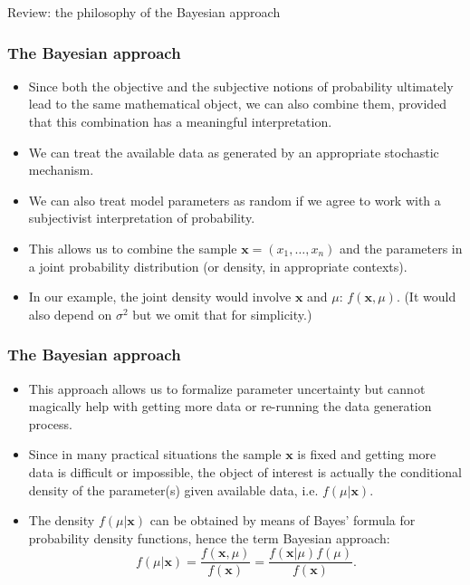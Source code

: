 \documentclass[10pt]{beamer}
\theoremstyle{definition}
\begin{document}
\begin{section}{Review: the philosophy of the Bayesian approach}
\begin{frame}
\frametitle{The Bayesian approach}
\begin{itemize}\itemsep1em
\item Since both the objective and the subjective notions of probability ultimately lead to the same mathematical object, we can also combine them, provided that this combination has a meaningful interpretation. \pause
\item We can treat the available data as generated by an appropriate stochastic mechanism.
\item We can also treat model parameters as random if we agree to work with a subjectivist interpretation of probability.
\item This allows us to combine the sample $\mathbf{x}=(x_1,\ldots,x_n)$ and the parameters in a joint probability distribution (or density, in appropriate contexts).
\item In our example, the joint density would involve $\mathbf{x}$ and
$\mu$: $f(\mathbf{x},\mu)$. (It would also depend on $ \sigma^2 $ but we omit that for simplicity.)
\end{itemize}
\end{frame}

\begin{frame}
\frametitle{The Bayesian approach}
\begin{itemize}\itemsep1em
\item This approach allows us to formalize parameter uncertainty but cannot magically help with getting more data or re-running the data generation process.
\item Since in many practical situations the sample $\mathbf{x}$ is fixed and getting more data is difficult or impossible, the object of interest is actually the conditional density of the parameter(s) given available data, i.e. $f(\mu|\mathbf{x})$.
\item The density $f(\mu|\mathbf{x})$ can be obtained by means of Bayes' formula for probability density functions, hence the term Bayesian approach:
\begin{equation}
\label{eq:Bayesformula}
f(\mu|\mathbf{x})=\frac{f(\mathbf{x},\mu)}{f(\mathbf{x})}=\frac{f(\mathbf{x}|\mu)f(\mu)}{f(\mathbf{x})}.
\end{equation}
\end{itemize}
\end{frame}


\end{section}
\end{document}
